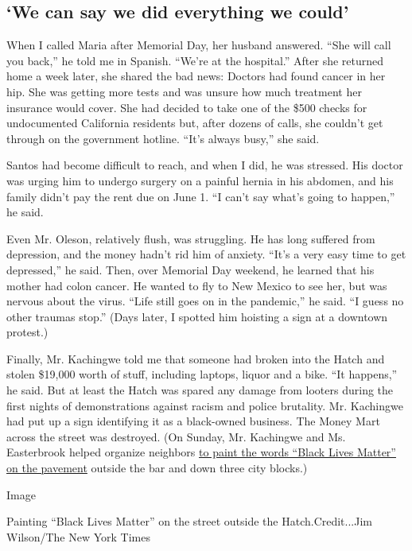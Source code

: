 \hypertarget{we-can-say-we-did-everything-we-could}{%
\subsection{`We can say we did everything we
could'}\label{we-can-say-we-did-everything-we-could}}

When I called Maria after Memorial Day, her husband answered. ``She will
call you back,'' he told me in Spanish. ``We're at the hospital.'' After
she returned home a week later, she shared the bad news: Doctors had
found cancer in her hip. She was getting more tests and was unsure how
much treatment her insurance would cover. She had decided to take one of
the \$500 checks for undocumented California residents but, after dozens
of calls, she couldn't get through on the government hotline. ``It's
always busy,'' she said.

Santos had become difficult to reach, and when I did, he was stressed.
His doctor was urging him to undergo surgery on a painful hernia in his
abdomen, and his family didn't pay the rent due on June 1. ``I can't say
what's going to happen,'' he said.

Even Mr. Oleson, relatively flush, was struggling. He has long suffered
from depression, and the money hadn't rid him of anxiety. ``It's a very
easy time to get depressed,'' he said. Then, over Memorial Day weekend,
he learned that his mother had colon cancer. He wanted to fly to New
Mexico to see her, but was nervous about the virus. ``Life still goes on
in the pandemic,'' he said. ``I guess no other traumas stop.'' (Days
later, I spotted him hoisting a sign at a downtown protest.)

Finally, Mr. Kachingwe told me that someone had broken into the Hatch
and stolen \$19,000 worth of stuff, including laptops, liquor and a
bike. ``It happens,'' he said. But at least the Hatch was spared any
damage from looters during the first nights of demonstrations against
racism and police brutality. Mr. Kachingwe had put up a sign identifying
it as a black-owned business. The Money Mart across the street was
destroyed. (On Sunday, Mr. Kachingwe and Ms. Easterbrook helped organize
neighbors
\href{https://www.youtube.com/watch?v=Os8jt3AFWz4\&feature=youtu.be}{to
paint the words ``Black Lives Matter'' on the pavement} outside the bar
and down three city blocks.)

Image

Painting ``Black Lives Matter'' on the street outside the
Hatch.Credit...Jim Wilson/The New York Times

